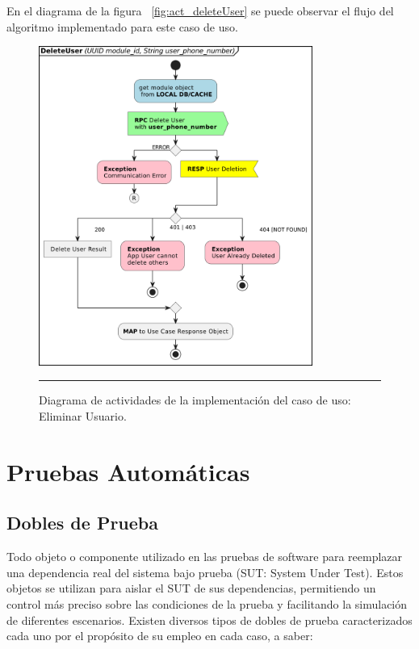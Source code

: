 En el diagrama de la figura ~\ref{fig:act_deleteUser} se puede observar el flujo del algoritmo implementado para este caso de uso.

\begin{figure}[htbp]
	\centering
	\includegraphics[width=0.8\textwidth]{Figures/iter2/ACT_deleteUser.png}
	\rule{35em}{1pt}
	\caption[Class Diagram]{Diagrama de actividades de la implementación del caso de uso: Eliminar Usuario.}
	\label{fig:act_act_deleteUser}
\end{figure}

\section{Pruebas Automáticas}

\subsection{Dobles de Prueba}
Todo objeto o componente utilizado en las pruebas de software para reemplazar una dependencia real del sistema bajo prueba (SUT: System Under Test). Estos objetos se utilizan para aislar el SUT de sus dependencias, permitiendo un control más preciso sobre las condiciones de la prueba y facilitando la simulación de diferentes escenarios.
Existen diversos tipos de dobles de prueba caracterizados cada uno por el propósito de su empleo en cada caso, a saber:

